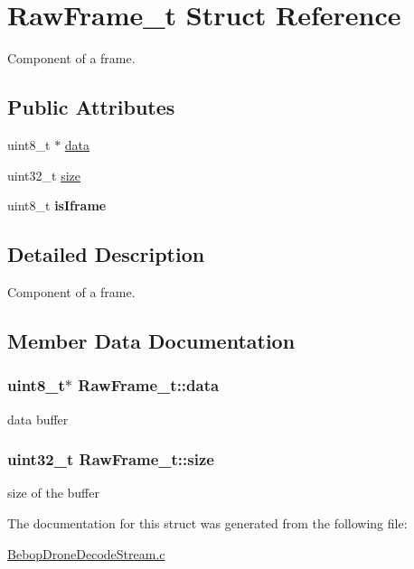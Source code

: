\hypertarget{structRawFrame__t}{}\section{Raw\+Frame\+\_\+t Struct Reference}
\label{structRawFrame__t}


Component of a frame.  


\subsection*{Public Attributes}
\begin{DoxyCompactItemize}
\item 
uint8\+\_\+t $\ast$ \hyperlink{structRawFrame__t_a53d5b44181a7d3160ae6ef910c61df8d}{data}
\item 
uint32\+\_\+t \hyperlink{structRawFrame__t_a3268f9bcece432d3e9bad16cc2c60ece}{size}
\item 
\hypertarget{structRawFrame__t_a8b8217c36048cc707fd04ebd5be39172}{}uint8\+\_\+t {\bfseries is\+Iframe}\label{structRawFrame__t_a8b8217c36048cc707fd04ebd5be39172}

\end{DoxyCompactItemize}


\subsection{Detailed Description}
Component of a frame. 

\subsection{Member Data Documentation}
\hypertarget{structRawFrame__t_a53d5b44181a7d3160ae6ef910c61df8d}{}
\subsubsection[{data}]{\setlength{\rightskip}{0pt plus 5cm}uint8\+\_\+t$\ast$ Raw\+Frame\+\_\+t\+::data}\label{structRawFrame__t_a53d5b44181a7d3160ae6ef910c61df8d}
data buffer \hypertarget{structRawFrame__t_a3268f9bcece432d3e9bad16cc2c60ece}{}
\subsubsection[{size}]{\setlength{\rightskip}{0pt plus 5cm}uint32\+\_\+t Raw\+Frame\+\_\+t\+::size}\label{structRawFrame__t_a3268f9bcece432d3e9bad16cc2c60ece}
size of the buffer 

The documentation for this struct was generated from the following file\+:\begin{DoxyCompactItemize}
\item 
\hyperlink{BebopDroneDecodeStream_8c}{Bebop\+Drone\+Decode\+Stream.\+c}\end{DoxyCompactItemize}
